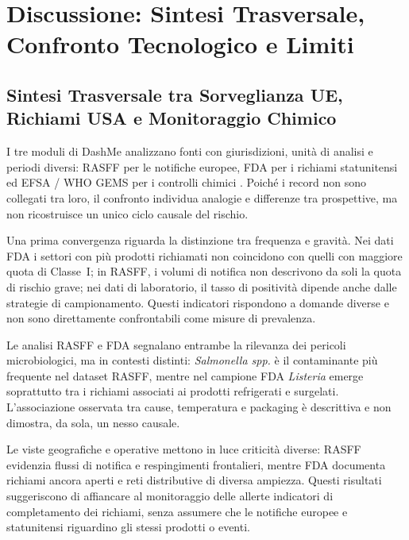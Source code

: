 \chapter{Discussione: Sintesi Trasversale, Confronto Tecnologico e Limiti}
\label{chap:discussion}

\section{Sintesi Trasversale tra Sorveglianza UE, Richiami USA e Monitoraggio Chimico}
\label{sec:disc_synthesis}

I tre moduli di DashMe analizzano fonti con giurisdizioni, unità di analisi e periodi diversi: RASFF per le notifiche europee, FDA per i richiami statunitensi ed EFSA / WHO GEMS per i controlli chimici \citep{rasff_portal,fda_recalls_portal,who_gems_efsa}. Poiché i record non sono collegati tra loro, il confronto individua analogie e differenze tra prospettive, ma non ricostruisce un unico ciclo causale del rischio.

Una prima convergenza riguarda la distinzione tra frequenza e gravità. Nei dati FDA i settori con più prodotti richiamati non coincidono con quelli con maggiore quota di Classe~I; in RASFF, i volumi di notifica non descrivono da soli la quota di rischio grave; nei dati di laboratorio, il tasso di positività dipende anche dalle strategie di campionamento. Questi indicatori rispondono a domande diverse e non sono direttamente confrontabili come misure di prevalenza.

Le analisi RASFF e FDA segnalano entrambe la rilevanza dei pericoli microbiologici, ma in contesti distinti: \textit{Salmonella spp.} è il contaminante più frequente nel dataset RASFF, mentre nel campione FDA \textit{Listeria} emerge soprattutto tra i richiami associati ai prodotti refrigerati e surgelati. L'associazione osservata tra cause, temperatura e packaging è descrittiva e non dimostra, da sola, un nesso causale.

Le viste geografiche e operative mettono in luce criticità diverse: RASFF evidenzia flussi di notifica e respingimenti frontalieri, mentre FDA documenta richiami ancora aperti e reti distributive di diversa ampiezza. Questi risultati suggeriscono di affiancare al monitoraggio delle allerte indicatori di completamento dei richiami, senza assumere che le notifiche europee e statunitensi riguardino gli stessi prodotti o eventi.

